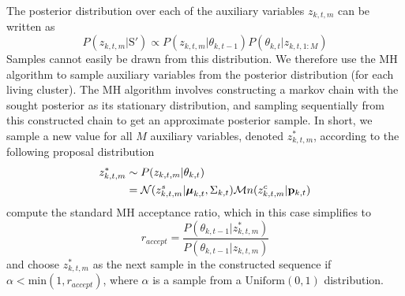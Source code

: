 \documentclass[twocolumn, final]{svjour3}
\newcommand{\willie}[1]{\textcolor{green}{\textsf{\emph{\textbf{\textcolor{green}{#1}}}}}}
\begin{document}
The posterior distribution over each of the auxiliary variables $z_{k,t,m}$ can be written as
\begin{equation}
\label{stationary_pdf}
P(z_{k,t,m} | \text{S}') \propto  P(z_{k,t,m} | \theta_{k,t-1}) P(\theta_{k,t} | z_{k,t,1:M})
\end{equation}
Samples cannot easily be drawn from this distribution. We therefore use the MH algorithm to sample auxiliary variables from the posterior distribution (for each living cluster). The MH algorithm involves constructing a markov chain with the sought posterior as its stationary distribution, and sampling sequentially from this constructed chain to get an approximate posterior sample. 
In short, we sample a new value for all $M$ auxiliary variables, denoted $z_{k,t,m}^{*}$, according to the following proposal distribution
\begin{align}
\begin{split}
\label{proposal_distro}
z_{k,t,m}^{*}  &\sim  P(z_{k,t,m} | \theta_{k,t}) \\
&= \mathcal{N}(z_{k,t,m}^{s} | \boldsymbol{\mu}_{k,t}, \Sigma_{k,t}) \mathcal{M}n(z_{k,t,m}^{c} | \bold{p}_{k,t})
\end{split}
\end{align}
compute the standard MH acceptance ratio, which in this case simplifies to 
\begin{equation}
\label{accept_ratio}
r_{accept} = \frac{P(\theta_{k,t-1} | z_{k,t,m}^{*})}{P(\theta_{k,t-1} | z_{k,t,m})}
\end{equation}
and choose $z_{k,t,m}^{*}$ as the next sample in the constructed sequence if $\alpha < \text{min}(1, r_{accept})$, where $\alpha$ is a sample from a $\text{Uniform}(0,1)$ distribution.
\end{document}
